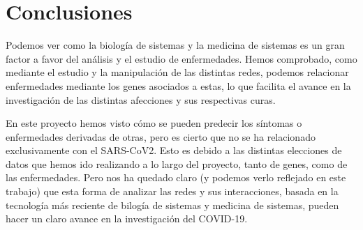 \newpage
\section{Conclusiones}

    Podemos ver como la biología de sistemas y la medicina de sistemas es un gran factor a favor del análisis y el estudio de enfermedades. Hemos comprobado, como mediante el estudio y la manipulación de las distintas redes, podemos relacionar enfermedades mediante los genes asociados a estas, lo que facilita el avance en la investigación de las distintas afecciones y sus respectivas curas. 

    En este proyecto hemos visto cómo se pueden predecir los síntomas o enfermedades derivadas de otras, pero es cierto que no se ha relacionado exclusivamente con el SARS-CoV2. Esto es debido a las distintas elecciones de datos que hemos ido realizando a lo largo del proyecto, tanto de genes, como de las enfermedades. Pero nos ha quedado claro (y podemos verlo reflejado en este trabajo) que esta forma de analizar las redes y sus interacciones, basada en la tecnología más reciente de bilogía de sistemas y medicina de sistemas, pueden hacer un claro avance en la investigación del COVID-19.